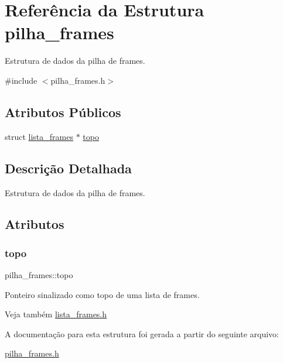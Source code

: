 \hypertarget{structpilha__frames}{}\section{Referência da Estrutura pilha\+\_\+frames}
\label{structpilha__frames}


Estrutura de dados da pilha de frames.  




{\ttfamily \#include $<$pilha\+\_\+frames.\+h$>$}

\subsection*{Atributos Públicos}
\begin{DoxyCompactItemize}
\item 
struct \hyperlink{structlista__frames}{lista\+\_\+frames} $\ast$ \hyperlink{structpilha__frames_adaba794f60371c7bcefb8f592e586c90}{topo}
\end{DoxyCompactItemize}


\subsection{Descrição Detalhada}
Estrutura de dados da pilha de frames. 

\subsection{Atributos}
\mbox{\label{structpilha__frames_adaba794f60371c7bcefb8f592e586c90}} 
\subsubsection{\texorpdfstring{topo}{topo}}
{\footnotesize\ttfamily pilha\+\_\+frames\+::topo}

Ponteiro sinalizado como \textquotesingle{}topo\textquotesingle{} de uma lista de frames. \begin{DoxySeeAlso}{Veja também}
\hyperlink{lista__frames_8h}{lista\+\_\+frames.\+h} 
\end{DoxySeeAlso}


A documentação para esta estrutura foi gerada a partir do seguinte arquivo\+:\begin{DoxyCompactItemize}
\item 
\hyperlink{pilha__frames_8h}{pilha\+\_\+frames.\+h}\end{DoxyCompactItemize}
